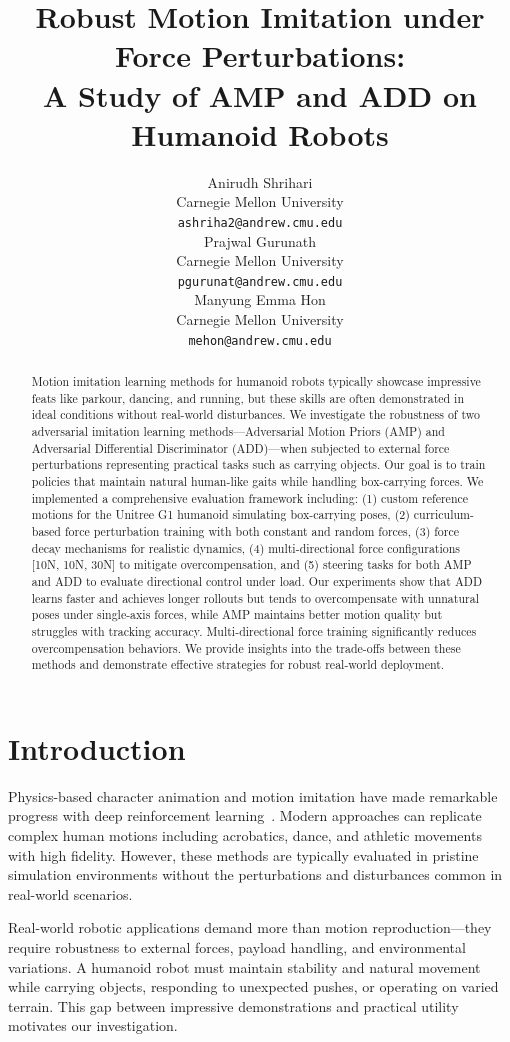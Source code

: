 \documentclass{article}
\title{Robust Motion Imitation under Force Perturbations: \\ A Study of AMP and ADD on Humanoid Robots}
\author{%
  Anirudh Shrihari \\
  Carnegie Mellon University\\
  \texttt{ashriha2@andrew.cmu.edu} \\
  \And
  Prajwal Gurunath \\
  Carnegie Mellon University\\
  \texttt{pgurunat@andrew.cmu.edu} \\
  \And
  Manyung Emma Hon \\
  Carnegie Mellon University\\
  \texttt{mehon@andrew.cmu.edu} \\
}
\begin{document}
\maketitle

\begin{abstract}
Motion imitation learning methods for humanoid robots typically showcase impressive feats like parkour, dancing, and running, but these skills are often demonstrated in ideal conditions without real-world disturbances. We investigate the robustness of two adversarial imitation learning methods—Adversarial Motion Priors (AMP) and Adversarial Differential Discriminator (ADD)—when subjected to external force perturbations representing practical tasks such as carrying objects. Our goal is to train policies that maintain natural human-like gaits while handling box-carrying forces. We implemented a comprehensive evaluation framework including: (1) custom reference motions for the Unitree G1 humanoid simulating box-carrying poses, (2) curriculum-based force perturbation training with both constant and random forces, (3) force decay mechanisms for realistic dynamics, (4) multi-directional force configurations [10N, 10N, 30N] to mitigate overcompensation, and (5) steering tasks for both AMP and ADD to evaluate directional control under load. Our experiments show that ADD learns faster and achieves longer rollouts but tends to overcompensate with unnatural poses under single-axis forces, while AMP maintains better motion quality but struggles with tracking accuracy. Multi-directional force training significantly reduces overcompensation behaviors. We provide insights into the trade-offs between these methods and demonstrate effective strategies for robust real-world deployment.
\end{abstract}

\section{Introduction}

Physics-based character animation and motion imitation have made remarkable progress with deep reinforcement learning~\citep{peng2018deepmimic,peng2021amp,zhang2025add}. Modern approaches can replicate complex human motions including acrobatics, dance, and athletic movements with high fidelity. However, these methods are typically evaluated in pristine simulation environments without the perturbations and disturbances common in real-world scenarios.

Real-world robotic applications demand more than motion reproduction—they require robustness to external forces, payload handling, and environmental variations. A humanoid robot must maintain stability and natural movement while carrying objects, responding to unexpected pushes, or operating on varied terrain. This gap between impressive demonstrations and practical utility motivates our investigation.
\end{document}
